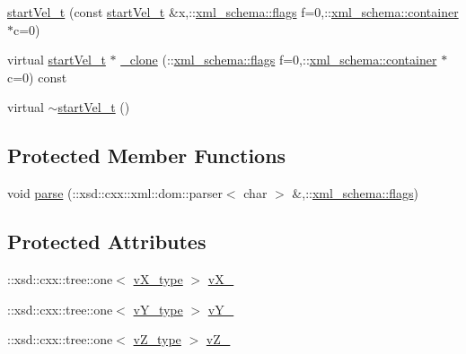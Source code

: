 \begin{DoxyCompactItemize}
\item 
\hyperlink{classstartVel__t_a0d6c57b67fc8159015fa7807f8f81d05}{start\-Vel\-\_\-t} (const \hyperlink{classstartVel__t}{start\-Vel\-\_\-t} \&x,\-::\hyperlink{namespacexml__schema_a0612287d030cb2732d31a45b258fdc87}{xml\-\_\-schema\-::flags} f=0,\-::\hyperlink{namespacexml__schema_ada9aa30dc722e93ee2ed7243085402a5}{xml\-\_\-schema\-::container} $\ast$c=0)
\item 
virtual \hyperlink{classstartVel__t}{start\-Vel\-\_\-t} $\ast$ \hyperlink{classstartVel__t_ac255e96e5edf2031c595e5e208d1f60d}{\-\_\-clone} (\-::\hyperlink{namespacexml__schema_a0612287d030cb2732d31a45b258fdc87}{xml\-\_\-schema\-::flags} f=0,\-::\hyperlink{namespacexml__schema_ada9aa30dc722e93ee2ed7243085402a5}{xml\-\_\-schema\-::container} $\ast$c=0) const 
\item 
virtual \hyperlink{classstartVel__t_a64d655e21bba1e5ce53ab87c0b4581c2}{$\sim$start\-Vel\-\_\-t} ()
\end{DoxyCompactItemize}
\subsection*{Protected Member Functions}
\begin{DoxyCompactItemize}
\item 
void \hyperlink{classstartVel__t_acd4c59a04a5c3ed1400ade7d2c7dc183}{parse} (\-::xsd\-::cxx\-::xml\-::dom\-::parser$<$ char $>$ \&,\-::\hyperlink{namespacexml__schema_a0612287d030cb2732d31a45b258fdc87}{xml\-\_\-schema\-::flags})
\end{DoxyCompactItemize}
\subsection*{Protected Attributes}
\begin{DoxyCompactItemize}
\item 
\-::xsd\-::cxx\-::tree\-::one$<$ \hyperlink{classstartVel__t_a4f5683f832e22f177e3dd87c931333fb}{v\-X\-\_\-type} $>$ \hyperlink{classstartVel__t_a184cae449a805c4d4d1cdbe907244de0}{v\-X\-\_\-}
\item 
\-::xsd\-::cxx\-::tree\-::one$<$ \hyperlink{classstartVel__t_ae5903806f237d8ceddf10c273a3d2002}{v\-Y\-\_\-type} $>$ \hyperlink{classstartVel__t_a4b0c39ac8d86dad52aa24ef43b44f3fb}{v\-Y\-\_\-}
\item 
\-::xsd\-::cxx\-::tree\-::one$<$ \hyperlink{classstartVel__t_ae5f77efcbc29e3290d1f36cb89fbd2bf}{v\-Z\-\_\-type} $>$ \hyperlink{classstartVel__t_a7e455032e785c56310e4f18acb650e94}{v\-Z\-\_\-}
\end{DoxyCompactItemize}


